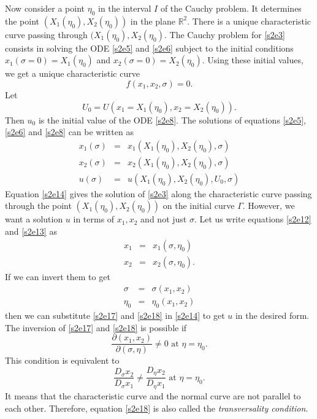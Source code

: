 \documentclass{article}
\theoremstyle{plain}
\numberwithin{thm}{section}
\theoremstyle{plain}
\numberwithin{prop}{section}
\theoremstyle{definition}
\numberwithin{defn}{section}
\theoremstyle{remark}
\numberwithin{equation}{section}
\begin{document}
Now consider a point $\eta_0$ in the interval $I$ of the Cauchy problem. It determines the point
$(X_1(\eta_0), X_2(\eta_0))$ in the plane $\mathbb{R}^2$. There is a unique characteristic curve
passing through $(X_1(\eta_0), X_2(\eta_0)$. The Cauchy problem for \eqref{s2e3} consists in solving
the ODE \eqref{s2e5} and \eqref{s2e6} subject to the initial conditions $x_1(\sigma = 0) = 
X_1(\eta_0)$ and $x_2(\sigma = 0) = X_2(\eta_0)$. Using these initial values, we get a unique
characteristic curve 
\begin{equation}\label{s2e10}
f(x_1, x_2, \sigma) = 0.
\end{equation} 
Let 
\begin{equation}\label{s2e11}
U_0 = U(x_1 = X_1(\eta_0), x_2 = X_2(\eta_0)).
\end{equation}
Then $u_0$ is the initial value of the ODE \eqref{s2e8}. The solutions of equations \eqref{s2e5}, 
\eqref{s2e6} and \eqref{s2e8} can be written as
\begin{eqnarray}
x_1(\sigma) &=& x_1(X_1(\eta_0), X_2(\eta_0), \sigma) \label{s2e12} \\
x_2(\sigma) &=& x_2(X_1(\eta_0), X_2(\eta_0), \sigma) \label{s2e13} \\
u(\sigma)   &=& u(X_1(\eta_0), X_2(\eta_0), U_0, \sigma) \label{s2e14}
\end{eqnarray}
Equation \eqref{s2e14} gives the solution of \eqref{s2e3} along the characteristic curve passing
through the point $(X_1(\eta_0), X_2(\eta_0))$ on the initial curve $\Gamma$. However, we want a 
solution $u$ in terms of $x_1, x_2$ and not just $\sigma$. Let us write equations \eqref{s2e12} and
\eqref{s2e13} as 
\begin{eqnarray}
x_1 &=& x_1(\sigma, \eta_0) \label{s2e15} \\
x_2 &=& x_2(\sigma, \eta_0). \label{s2e16}
\end{eqnarray}
If we can invert them to get
\begin{eqnarray}
\sigma &=& \sigma(x_1, x_2) \label{s2e17} \\
\eta_0 &=& \eta_0(x_1, x_2) \label{s2e18}
\end{eqnarray}
then we can substitute \eqref{s2e17} and \eqref{s2e18} in \eqref{s2e14} to get $u$ in the desired
form. The inversion of \eqref{s2e17} and \eqref{s2e18} is possible if 
\begin{equation}\label{s2e19}
\frac{\partial(x_1, x_2)}{\partial(\sigma, \eta)} \ne 0 \text{ at } \eta = \eta_0.
\end{equation}
This condition is equivalent to
\[
\frac{D_\sigma x_2}{D_\sigma x_1} \ne \frac{D_\eta x_2}{D_\eta x_1} \text{ at } \eta = \eta_0.
\]
It means that the characteristic curve and the normal curve are not parallel to each other. Therefore,
equation \eqref{s2e18} is also called the \emph{transversality condition}.
\end{document}
